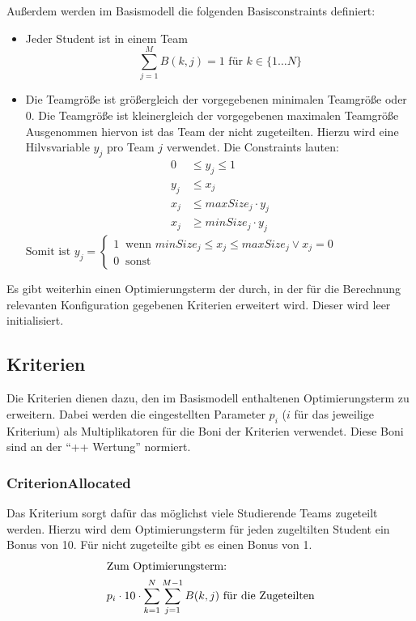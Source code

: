\documentclass[parskip=full]{scrartcl}
\begin{document}
Außerdem werden im Basismodell die folgenden Basisconstraints definiert:



 \begin{itemize}
   \item Jeder Student ist in einem Team \begin{equation*}
   \sum_{j = 1}^{M} B(k,j) = 1 \text{ für } k \in \{ 1\ldots N \}
   \end{equation*}
   \item Die Teamgröße ist größergleich der vorgegebenen minimalen Teamgröße
   oder 0. Die Teamgröße ist kleinergleich der vorgegebenen maximalen Teamgröße
   Ausgenommen hiervon ist das Team der nicht zugeteilten. Hierzu wird eine
   Hilvsvariable $y_j$ pro Team $j$ verwendet. Die Constraints lauten:
   \begin{align*}
    0 &\le  y_j \le 1\\
     y_j &\le x_j\\ 
    x_j &\le maxSize_j \cdot y_j \\ 
    x_j &\ge minSize_j \cdot y_j 
    \end{align*}
    $\text{Somit ist } y_j = \begin{cases}
    1 \;\; \text{wenn $minSize_j \le x_j \le maxSize_j \vee x_j = 0$} \\
    0 \;\; \text{sonst} 
    \end{cases}$
 \end{itemize}
 
 Es gibt weiterhin einen Optimierungsterm der durch, in der für die Berechnung
 relevanten Konfiguration gegebenen Kriterien erweitert wird. Dieser wird leer
 initialisiert.


\subsection{Kriterien}
Die Kriterien dienen dazu, den im Basismodell enthaltenen Optimierungsterm zu
erweitern. Dabei werden die eingestellten Parameter $p_i$ ($i$ für das
jeweilige Kriterium) als Multiplikatoren für die Boni der Kriterien verwendet.
Diese Boni sind an der \enquote{++ Wertung} normiert. 

\subsubsection{CriterionAllocated}
Das Kriterium sorgt dafür das möglichst viele Studierende Teams zugeteilt
werden. Hierzu wird dem Optimierungsterm für jeden zugeltilten Student ein Bonus
von 10. Für nicht zugeteilte gibt es einen Bonus von 1. \begin{align*}
\intertext{Zum Optimierungsterm:}
p_i \cdot 10 \cdot \sum_{k = 1}^{N} \sum_{j = 1}^{M-1} B(k,j) \text{ für die
Zugeteilten}
\end{align*}
\end{document}
